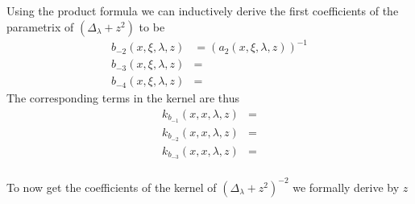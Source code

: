 Using the product formula we can inductively derive the first coefficients
of the parametrix of $(\Delta_\lambda + z^2)$ to be
\begin{align}
    b_{-2}(x,\xi,\lambda,z) &= (a_2(x,\xi,\lambda,z))^{-1} \\
    b_{-3}(x,\xi,\lambda,z) &= \\
    b_{-4}(x,\xi,\lambda,z) &=
    \label{eqn:coeff-symbol}
\end{align}
The corresponding terms in the kernel are thus
\begin{align}
    k_{b_{-1}}(x,x,\lambda,z) &= \\
    k_{b_{-2}}(x,x,\lambda,z) &= \\
    k_{b_{-3}}(x,x,\lambda,z) &= \\
    \label{eqn:coeff-kernel}
\end{align}

To now get the coefficients of the kernel of $(\Delta_\lambda + z^2)^{-2}$ we
formally derive by $z$



